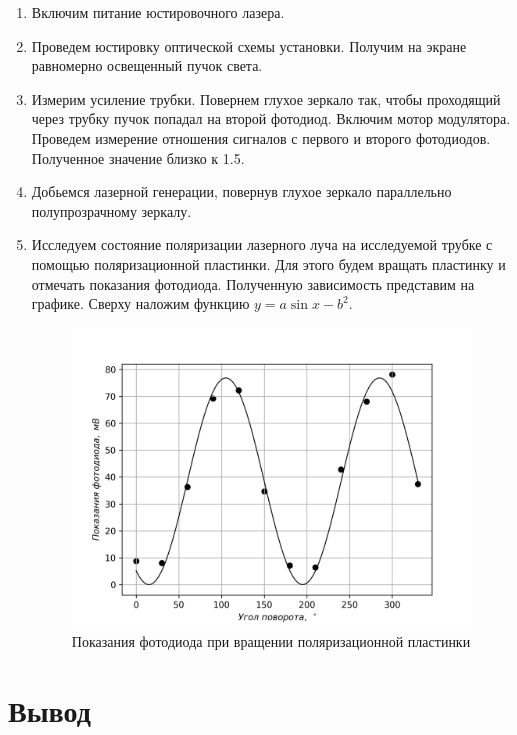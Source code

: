 \documentclass[14pt, a4paper]{report}
\begin{document}
\begin{enumerate}

\setcounter{enumi}{0}

\item Включим питание юстировочного лазера.

\item Проведем юстировку оптической схемы установки. Получим на экране равномерно освещенный пучок света.

\item Измерим усиление трубки. Повернем глухое зеркало так, чтобы проходящий через трубку пучок попадал на второй фотодиод. Включим мотор модулятора. Проведем измерение отношения сигналов с первого и второго фотодиодов. Полученное значение близко к 1.5.

\item Добьемся лазерной генерации, повернув глухое зеркало параллельно полупрозрачному зеркалу.

\item Исследуем состояние поляризации лазерного луча на исследуемой трубке с помощью поляризационной пластинки. Для этого будем вращать пластинку и отмечать показания фотодиода. Полученную зависимость представим на графике. Сверху наложим функцию $y=a\sin{x-b}^2$.

\begin{figure}[H]
\centering
\includegraphics[scale=0.6]{images/451_1.png}
\caption{Показания фотодиода при вращении поляризационной пластинки}
\end{figure}


\end{enumerate}

\section{Вывод}
\end{document}
